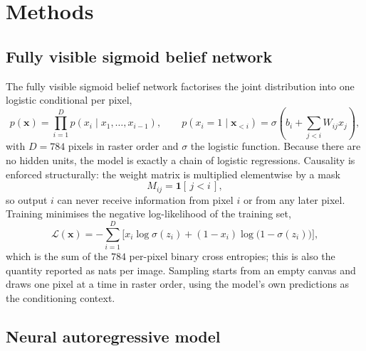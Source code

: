 \documentclass[11pt,a4paper]{article}
\begin{document}
\section{Methods}

\subsection{Fully visible sigmoid belief network}
\label{sec:fvsbn}

The fully visible sigmoid belief network factorises the joint distribution into one logistic
conditional per pixel,
\begin{equation}
  p(\mathbf{x}) = \prod_{i=1}^{D} p(x_i \mid x_{1},\dots,x_{i-1}),
  \qquad
  p(x_i=1\mid \mathbf{x}_{<i}) = \sigma\!\left(b_i + \sum_{j<i} W_{ij} x_j\right),
  \label{eq:fvsbn}
\end{equation}
with $D=784$ pixels in raster order and $\sigma$ the logistic function.
Because there are no hidden units, the model is exactly a chain of logistic regressions.
Causality is enforced structurally: the weight matrix is multiplied elementwise by a mask
\begin{equation}
  M_{ij} = \mathbf{1}[\,j < i\,],
\end{equation}
so output $i$ can never receive information from pixel $i$ or from any later pixel.
Training minimises the negative log-likelihood of the training set,
\begin{equation}
  \mathcal{L}(\mathbf{x}) = -\sum_{i=1}^{D} \Big[ x_i \log \sigma(z_i) + (1-x_i)\log\big(1-\sigma(z_i)\big)\Big],
  \label{eq:nll}
\end{equation}
which is the sum of the $784$ per-pixel binary cross entropies; this is also the quantity
reported as nats per image.
Sampling starts from an empty canvas and draws one pixel at a time in raster order, using the
model's own predictions as the conditioning context.

\subsection{Neural autoregressive model}
\label{sec:made}
\end{document}
